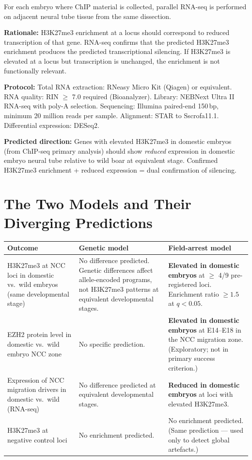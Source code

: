 \documentclass[10pt, a4paper]{article}
\begin{document}
For each embryo where ChIP material is
collected, parallel RNA-seq is performed
on adjacent neural tube tissue from the
same dissection.

\textbf{Rationale:} H3K27me3 enrichment at
a locus should correspond to reduced
transcription of that gene. RNA-seq confirms
that the predicted H3K27me3 enrichment
produces the predicted transcriptional
silencing. If H3K27me3 is elevated at
a locus but transcription is unchanged,
the enrichment is not functionally relevant.

\textbf{Protocol:}
Total RNA extraction: RNeasy Micro Kit
(Qiagen) or equivalent.
RNA quality: RIN $\geq$ 7.0 required
(Bioanalyzer).
Library: NEBNext Ultra II RNA-seq with
poly-A selection.
Sequencing: Illumina paired-end 150\,bp,
minimum 20 million reads per sample.
Alignment: STAR to Sscrofa11.1.
Differential expression: DESeq2.

\textbf{Predicted direction:}
Genes with elevated H3K27me3 in domestic
embryos (from ChIP-seq primary analysis)
should show \textit{reduced} expression
in domestic embryo neural tube relative
to wild boar at equivalent stage.
Confirmed H3K27me3 enrichment + reduced
expression = dual confirmation of silencing.

\section{The Two Models and Their
Diverging Predictions}
\label{sec:models}

\begin{center}
\small
\begin{tabular}{p{4.5cm}p{4.5cm}p{4.5cm}}
\toprule
\textbf{Outcome} &
\textbf{Genetic model} &
\textbf{Field-arrest model} \\
\midrule
H3K27me3 at NCC loci in
domestic vs.\ wild embryos
(same developmental stage) &
No difference predicted.
Genetic differences affect
allele-encoded programs,
not H3K27me3 patterns at
equivalent developmental stages. &
\textbf{Elevated in domestic embryos}
at $\geq$ 4/9 pre-registered loci.
Enrichment ratio $\geq 1.5$ at
$q < 0.05$. \\[0.4em]
EZH2 protein level in domestic
vs.\ wild embryo NCC zone &
No specific prediction. &
\textbf{Elevated in domestic embryos}
at E14--E18 in the NCC migration zone.
(Exploratory; not in primary success
criterion.) \\[0.4em]
Expression of NCC migration
drivers in domestic vs.\ wild
(RNA-seq) &
No difference predicted at
equivalent developmental stages. &
\textbf{Reduced in domestic embryos}
at loci with elevated H3K27me3. \\[0.4em]
H3K27me3 at negative control loci &
No enrichment predicted. &
No enrichment predicted.
(Same prediction --- used only
to detect global artefacts.) \\
\bottomrule
\end{tabular}
\end{center}
\end{document}
